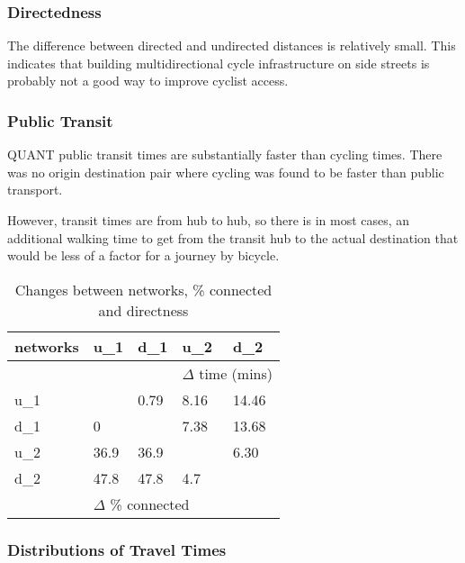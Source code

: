 \subsubsection{Directedness}

The difference between directed and undirected distances is relatively small. This indicates that building multidirectional cycle infrastructure on side streets is probably not a good way to improve cyclist access.  


\subsubsection{Public Transit}

QUANT public transit times are substantially faster than cycling times. There was no origin destination pair where cycling was found to be faster than public transport. 

However, transit times are from hub to hub, so there is in most cases, an additional walking time to get from the transit hub to the actual destination that would be less of a factor for a journey by bicycle. 

\begin{table}
\centering
\begin{tabular}{@{}lllll@{}}
\toprule
networks & u\_1   & d\_1  & u\_2            & d\_2          \\ \midrule
         &        &       & \multicolumn{2}{l}{$\Delta$ time (mins)}  \\
u\_1     &       &  0.79 & 8.16            & 14.46         \\
d\_1     & 0      &      & 7.38            & 13.68         \\
u\_2     & 36.9   & 36.9  &                & 6.30          \\
d\_2     & 47.8   & 47.8  & 4.7             &              \\
         & \multicolumn{3}{l}{$\Delta$ \% connected} &               \\ \bottomrule
\end{tabular}
\caption{Changes between networks, \% connected and directness}
\label{table:change between nets}
\end{table}


\subsubsection{Distributions of Travel Times}

